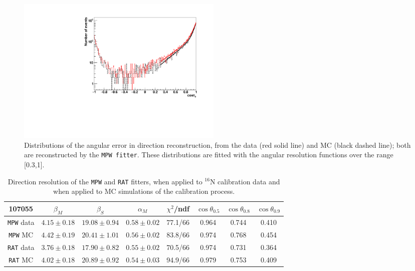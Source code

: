 \begin{figure}
	\centering
	\includegraphics[width=10cm]{16NangularResol.pdf}
	\caption[Distributions of the angular error in direction reconstruction, from the data and from MC.]{Distributions of the angular error in direction reconstruction, from the data (red solid line) and MC (black dashed line); both are reconstructed by the \texttt{MPW fitter}. These distributions are fitted with the angular resolution functions over the range [0.3,1].\label{angularResolMPW}}
\end{figure}

\begin{table}[ht]
	\caption[Direction resolution of the \texttt{MPW} and \texttt{RAT} fitters.]{Direction resolution of the \texttt{MPW} and \texttt{RAT} fitters, when applied to $^{16}$N calibration data and when applied to MC simulations of the calibration process.\label{tab:angularResolValuesUpdated}}
	\vspace{2.5mm}
	\begin{tabular}{cccccccc}%
		\toprule
	107055& $\beta_M$ &  $\beta_S$ & $\alpha_M$ & $\chi^2$/ndf & $\cos\theta_{0.5}$ & $\cos\theta_{0.8}$& $\cos\theta_{0.9}$\\
	\midrule
	\texttt{MPW} data & $4.15\pm0.18$ & $19.08\pm0.94$ & $0.58\pm0.02$ & 77.1/66 & 0.964 & 0.744 & 0.410 \\
	\texttt{MPW} MC & $4.42\pm0.19$ & $20.41\pm1.01$ & $0.56\pm0.02$ & 83.8/66 & 0.974 & 0.768 & 0.454	 \\	
\hline
	\texttt{RAT} data & $3.76\pm0.18$ & $17.90\pm0.82$ & $0.55\pm0.02$ & 70.5/66 & 0.974 & 0.731 & 0.364 \\
	\texttt{RAT} MC & $4.02\pm0.18$ & $20.89\pm0.92$ & $0.54\pm0.03$ & 94.9/66 & 0.979 & 0.753 & 0.409	\\
		\bottomrule
	\end{tabular}
\end{table}

